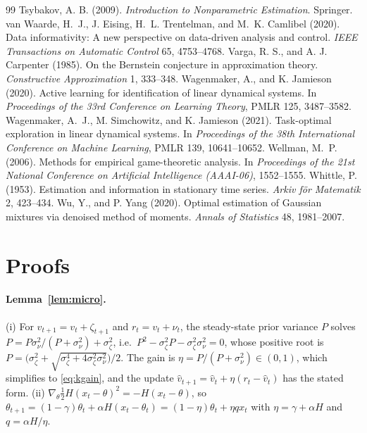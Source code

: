 \documentclass[12pt]{article}
\theoremstyle{definition}
\theoremstyle{remark}
\begin{document}
\begin{thebibliography}{99}
 Tsybakov, A. B. (2009). \emph{Introduction to Nonparametric Estimation}. Springer.
 van Waarde, H.~J., J. Eising, H.~L. Trentelman, and M.~K. Camlibel (2020). Data informativity: A new perspective on data-driven analysis and control. \emph{IEEE Transactions on Automatic Control} 65, 4753--4768.
 Varga, R. S., and A. J. Carpenter (1985). On the Bernstein conjecture in approximation theory. \emph{Constructive Approximation} 1, 333--348.
 Wagenmaker, A., and K. Jamieson (2020). Active learning for identification of linear dynamical systems. In \emph{Proceedings of the 33rd Conference on Learning Theory}, PMLR 125, 3487--3582.
 Wagenmaker, A.~J., M. Simchowitz, and K. Jamieson (2021). Task-optimal exploration in linear dynamical systems. In \emph{Proceedings of the 38th International Conference on Machine Learning}, PMLR 139, 10641--10652.
 Wellman, M.~P. (2006). Methods for empirical game-theoretic analysis. In \emph{Proceedings of the 21st National Conference on Artificial Intelligence (AAAI-06)}, 1552--1555.
 Whittle, P. (1953). Estimation and information in stationary time series. \emph{Arkiv f\"or Matematik} 2, 423--434.
 Wu, Y., and P. Yang (2020). Optimal estimation of Gaussian mixtures via denoised method of moments. \emph{Annals of Statistics} 48, 1981--2007.
\end{thebibliography}

\appendix
\section{Proofs}\label{app:proofs}

\paragraph{Lemma~\ref{lem:micro}.} (i) For $v_{t+1}=v_t+\zeta_{t+1}$ and $r_t=v_t+\nu_t$, the steady-state prior variance $P$ solves $P=P\sigma_\nu^2/(P+\sigma_\nu^2)+\sigma_\zeta^2$, i.e.\ $P^2-\sigma_\zeta^2P-\sigma_\zeta^2\sigma_\nu^2=0$, whose positive root is $P=\bigl(\sigma_\zeta^2+\sqrt{\sigma_\zeta^4+4\sigma_\zeta^2\sigma_\nu^2}\bigr)/2$. The gain is $\eta=P/(P+\sigma_\nu^2)\in(0,1)$, which simplifies to \eqref{eq:kgain}, and the update $\hat v_{t+1}=\hat v_t+\eta(r_t-\hat v_t)$ has the stated form. (ii) $\nabla_\theta\tfrac12H(x_t-\theta)^2=-H(x_t-\theta)$, so $\theta_{t+1}=(1-\gamma)\theta_t+\alpha H(x_t-\theta_t)=(1-\eta)\theta_t+\eta qx_t$ with $\eta=\gamma+\alpha H$ and $q=\alpha H/\eta$.
\end{document}
